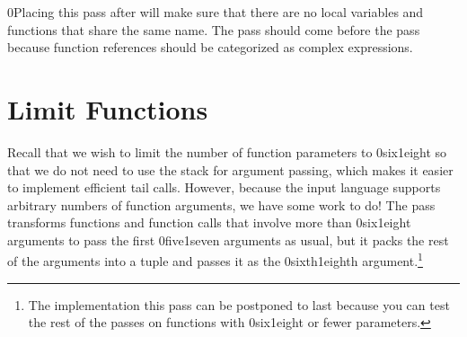 \documentclass[7x10]{TimesAPriori_MIT}%
\newcommand{\gray}[1]{{\color{gray} #1}}
\def\racketEd{0}
\def\pythonEd{1}
\def\edition{1}
\def\xeightysixEd{0}
\def\riscvEd{1}
\def\architecture{1}
\newcommand\ifriscv[1]{\if\architecture\riscvEd{#1}\fi}
\newcommand\ifxeightsix[1]{\if\architecture\xeightysixEd{#1}\fi}
\newcommand{\racket}[1]{{\if\edition\racketEd{#1}\fi}}
\newcommand{\pythonColor}[0]{}
\numberwithin{theorem}{chapter}
\numberwithin{definition}{chapter}
\numberwithin{equation}{chapter}
\begin{document}


\racket{Placing this pass after  will make sure that
  there are no local variables and functions that share the same
  name.}
%
The  pass should come before the
 pass because function references
should be categorized as complex expressions.

\section{Limit Functions}
\label{sec:limit-functions-r4}

Recall that we wish to limit the number of function parameters to \ifxeightsix{six}\ifriscv{eight}
so that we do not need to use the stack for argument passing, which
makes it easier to implement efficient tail calls.  However, because
the input language \LangFun{} supports arbitrary numbers of function
arguments, we have some work to do! The  pass
transforms functions and function calls that involve more than \ifxeightsix{six}\ifriscv{eight}
arguments to pass the first \ifxeightsix{five}\ifriscv{seven} arguments as usual, but it packs the
rest of the arguments into a tuple and passes it as the \ifxeightsix{sixth}\ifriscv{eighth}
argument.\footnote{The implementation this pass can be postponed to
  last because you can test the rest of the passes on functions with
  \ifxeightsix{six}\ifriscv{eight} or fewer parameters.}
\end{document}
